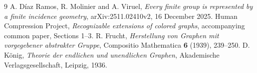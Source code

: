 \begin{thebibliography}{9}
 A. D\'iaz Ramos, R. Molinier and A. Viruel,
\emph{Every finite group is represented by a finite incidence geometry},
arXiv:2511.02410v2, 16 December 2025.
 Human Compression Project,
\emph{Recognizable extensions of colored graphs}, accompanying common paper,
Sections 1--3.
 R. Frucht, \emph{Herstellung von Graphen mit vorgegebener
abstrakter Gruppe}, Compositio Mathematica \textbf{6} (1939), 239--250.
 D. K\"onig, \emph{Theorie der endlichen und unendlichen Graphen},
Akademische Verlagsgesellschaft, Leipzig, 1936.
\end{thebibliography}
